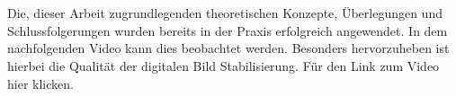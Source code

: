 \\ \\
Die, dieser Arbeit zugrundlegenden theoretischen Konzepte, Überlegungen und Schlussfolgerungen wurden bereits in der Praxis erfolgreich angewendet. In dem nachfolgenden Video kann dies beobachtet werden. Besonders hervorzuheben ist hierbei die Qualität der digitalen Bild Stabilisierung. Für den Link zum Video hier klicken.